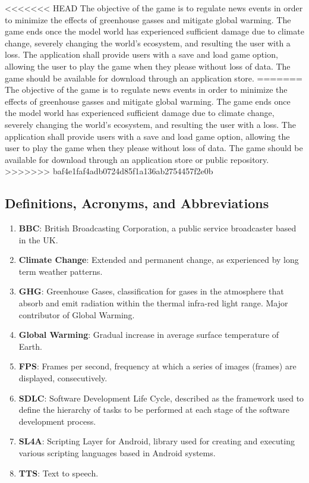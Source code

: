 \documentclass[]{article}
\begin{document}
<<<<<<< HEAD
The objective of the game is to regulate news events in order to minimize the effects of greenhouse gasses and mitigate global warming. The game ends once the model world has experienced sufficient damage due to climate change, severely changing the world's ecosystem, and resulting the user with a loss. The application shall provide users with a save and load game option, allowing the user to play the game when they please without loss of data. The game should be available for download through an application store.
=======
The objective of the game is to regulate news events in order to minimize the effects of greenhouse gasses and mitigate global warming. The game ends once the model world has experienced sufficient damage due to climate change, severely changing the world's ecosystem, and resulting the user with a loss. The application shall provide users with a save and load game option, allowing the user to play the game when they please without loss of data. The game should be available for download through an application store or public repository.
>>>>>>> baf4e1faf4adb0724d85f1a136ab2754457f2e0b

\subsection{Definitions, Acronyms, and Abbreviations}
\label{sub:definitions_acronyms_and_abbreviations}
\begin{enumerate}
\item \textbf{BBC}: British Broadcasting Corporation, a public service broadcaster based in the UK.
\item \textbf{Climate Change}: Extended and permanent change, as experienced by long term weather patterns.
\item \textbf{GHG}: Greenhouse Gases, classification for gases in the atmosphere that absorb and emit radiation within the thermal infra-red light range. Major contributor of Global Warming.
\item \textbf{Global Warming}: Gradual increase in average surface temperature of Earth.
\item\textbf{FPS}: Frames per second,  frequency at which a series of images (frames) are displayed, consecutively.
\item \textbf{SDLC}: Software Development Life Cycle, described as the framework used to define the hierarchy of tasks to be performed at each stage of the software development process.
\item \textbf{SL4A}:  Scripting Layer for Android, library used for creating and executing various scripting languages based in Android systems.
\item \textbf{TTS}: Text to speech.
\end{enumerate}
\end{document}
